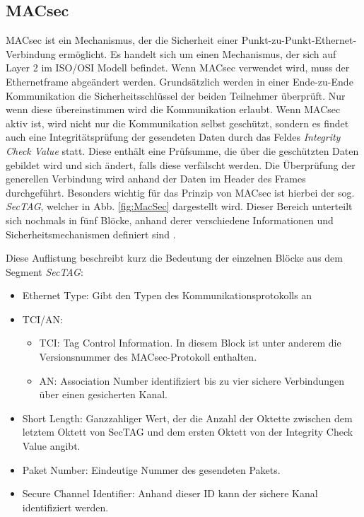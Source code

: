 \subsection{\acf{MACsec}}\label{sec:MacSec}
\acs{MACsec} ist ein Mechanismus, der die Sicherheit einer Punkt-zu-Punkt-Ethernet-Verbindung ermöglicht. Es handelt sich um einen Mechanismus, der sich auf Layer 2 im ISO/OSI Modell befindet. Wenn \acs{MACsec} verwendet wird, muss der Ethernetframe abgeändert werden. \newline
Grundsätzlich werden in einer Ende-zu-Ende Kommunikation die Sicherheitsschlüssel der beiden Teilnehmer überprüft. Nur wenn diese übereinstimmen wird die Kommunikation erlaubt. Wenn \acs{MACsec} aktiv ist, wird nicht nur die Kommunikation selbst geschützt, sondern es findet auch eine Integritätsprüfung der gesendeten Daten durch das Feldes \emph{Integrity Check Value} statt. Diese enthält eine Prüfsumme, die über die geschützten Daten gebildet wird und sich ändert, falls diese verfälscht werden. Die Überprüfung der generellen Verbindung wird anhand der Daten im Header des Frames durchgeführt. 
\newpage
Besonders wichtig für das Prinzip von \acs{MACsec} ist hierbei der sog. \emph{SecTAG}\cite{IEEE802_1AE_SEC}, welcher in Abb. \ref{fig:MacSec} dargestellt wird. Dieser Bereich unterteilt sich nochmals in fünf Blöcke, anhand derer verschiedene Informationen und Sicherheitsmechanismen definiert sind \cite{IEEE802_1AE_SEC}.



Diese Auflistung beschreibt kurz die Bedeutung der einzelnen Blöcke aus dem Segment \emph{SecTAG}:
\begin{itemize}
	\renewcommand{\labelitemi}{$\bullet$}
	\renewcommand{\labelitemii}{\scriptsize$\blacksquare$}
	\item Ethernet Type: Gibt den Typen des Kommunikationsprotokolls an \cite{EthernetType}
	\item TCI/AN:
		\begin{itemize}
			\item TCI: Tag Control Information. In diesem Block ist unter anderem die Versionsnummer des  \acs{MACsec}-Protokoll enthalten.
		\end{itemize}
		\begin{itemize}
			\item AN: Association Number identifiziert bis zu vier sichere Verbindungen über einen gesicherten Kanal.
		\end{itemize}
	\item Short Length: Ganzzahliger Wert, der die Anzahl der Oktette zwischen dem letztem Oktett von SecTAG und dem ersten Oktett von der Integrity Check Value angibt.
	\item Paket Number: Eindeutige Nummer des gesendeten Pakets.
	\item Secure Channel Identifier: Anhand dieser ID kann der sichere Kanal identifiziert werden.
\end{itemize}

\newpage

